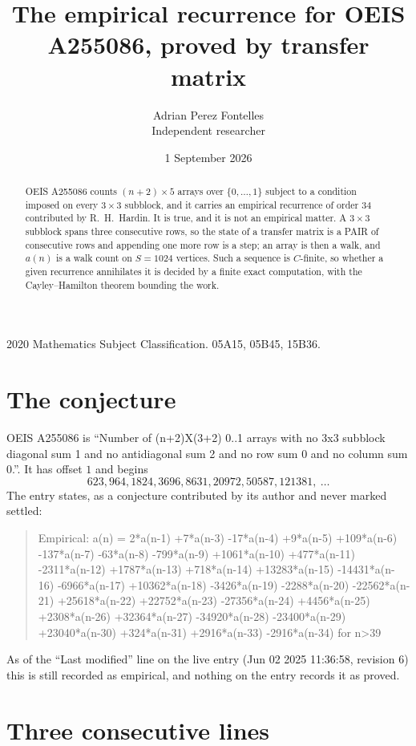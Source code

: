 \documentclass[11pt,a4paper]{article}
\title{The empirical recurrence for OEIS A255086, proved by transfer matrix}
\author{Adrian Perez Fontelles\\ \small Independent researcher}
\date{1 September 2026}
\theoremstyle{plain}
\theoremstyle{definition}
\begin{document}
\maketitle

\begin{abstract}
OEIS A255086 counts $(n+2)\times5$ arrays over $\{0,\dots,1\}$ subject to a condition imposed on
every $3\times3$ subblock, and it carries an empirical recurrence of order $34$
contributed by R.~H.~Hardin. It is true, and it is not an empirical matter. A $3\times3$
subblock spans three consecutive rows, so the state of a transfer matrix is a PAIR of
consecutive rows and appending one more row is a step; an array is then a walk, and
$a(n)$ is a walk count on $S=1024$ vertices. Such a sequence is $C$-finite, so whether a given
recurrence annihilates it is decided by a finite exact computation, with the Cayley--Hamilton
theorem bounding the work.
\end{abstract}

\noindent\small 2020 Mathematics Subject Classification. 05A15, 05B45, 15B36.\normalsize

\section{The conjecture}

OEIS A255086 is ``Number of (n+2)X(3+2) 0..1 arrays with no 3x3 subblock diagonal sum 1 and no antidiagonal sum 2 and no row sum 0 and no column sum 0.''. It has offset $1$ and begins
\[
623, 964, 1824, 3696, 8631, 20972, 50587, 121381,\ \dots
\]
The entry states, as a conjecture contributed by its author and never marked settled:
\begin{quote}
Empirical: a(n) = 2*a(n-1) +7*a(n-3) -17*a(n-4) +9*a(n-5) +109*a(n-6) -137*a(n-7) -63*a(n-8) -799*a(n-9) +1061*a(n-10) +477*a(n-11) -2311*a(n-12) +1787*a(n-13) +718*a(n-14) +13283*a(n-15) -14431*a(n-16) -6966*a(n-17) +10362*a(n-18) -3426*a(n-19) -2288*a(n-20) -22562*a(n-21) +25618*a(n-22) +22752*a(n-23) -27356*a(n-24) +4456*a(n-25) +2308*a(n-26) +32364*a(n-27) -34920*a(n-28) -23400*a(n-29) +23040*a(n-30) +324*a(n-31) +2916*a(n-33) -2916*a(n-34) for n>39
\end{quote}
As of the ``Last modified'' line on the live entry (Jun 02 2025 11:36:58, revision 6) this is still
recorded as empirical, and nothing on the entry records it as proved.

\section{Three consecutive lines}
\end{document}
